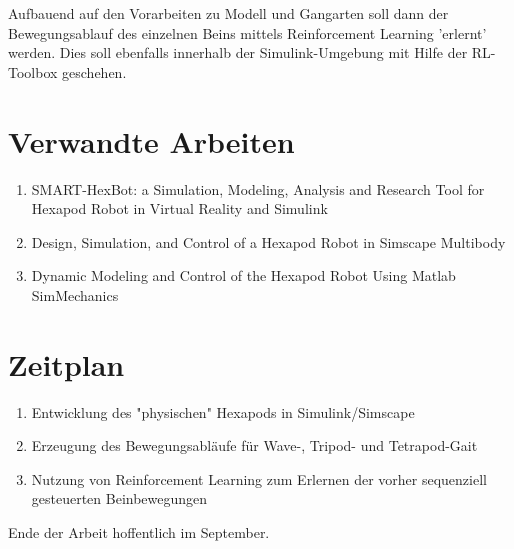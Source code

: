 Aufbauend auf den Vorarbeiten zu Modell und Gangarten soll dann der Bewegungsablauf des einzelnen Beins mittels Reinforcement Learning 'erlernt' werden. Dies soll ebenfalls innerhalb der Simulink-Umgebung mit Hilfe der RL-Toolbox geschehen.





\section{Verwandte Arbeiten}
\begin{enumerate}
\item SMART-HexBot: a Simulation, Modeling, Analysis and
Research Tool for Hexapod Robot in Virtual Reality and
Simulink

\item Design, Simulation, and Control of a Hexapod Robot in
Simscape Multibody

\item Dynamic Modeling and Control of the Hexapod Robot Using Matlab SimMechanics

\end{enumerate}


\section{Zeitplan}
\begin{enumerate}
	\item Entwicklung des "physischen" Hexapods in Simulink/Simscape
	\item Erzeugung des Bewegungsabläufe für Wave-, Tripod- und Tetrapod-Gait
	\item Nutzung von Reinforcement Learning zum Erlernen der vorher sequenziell gesteuerten Beinbewegungen
\end{enumerate}


Ende der Arbeit hoffentlich im September.